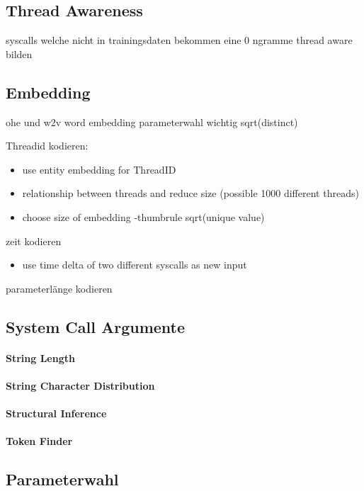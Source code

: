     \subsection{Thread Awareness}
        syscalls welche nicht in trainingsdaten bekommen eine 0
        ngramme thread aware bilden

    \subsection{Embedding}
    \label{sec:embedding}
        ohe und w2v
        word embedding parameterwahl wichtig sqrt(distinct)

        Threadid kodieren: 
        \begin{itemize}
            \item use entity embedding for ThreadID \cite{GUO2016} 
            \item relationship between threads and reduce size (possible 1000 different threads)
            \item choose size of embedding -thumbrule sqrt(unique value) 
        \end{itemize}
        zeit kodieren
        \begin{itemize}
            \item use time delta of two different syscalls as new input
        \end{itemize}
        parameterlänge kodieren

    \subsection{System Call Argumente}
    \label{sec:args}
            \paragraph{String Length}
            \paragraph{String Character Distribution}
            \paragraph{Structural Inference}
            \paragraph{Token Finder}

\subsection{Parameterwahl}

